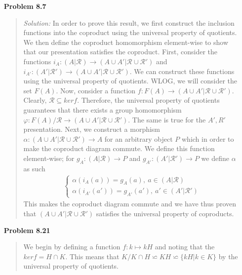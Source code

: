 \documentclass{article}
\newcommand{\Solution}{\textit{Solution: }}
\begin{document}
\begin{enumerate}
        \item[\textbf{Problem 8.7}]
        \begin{quote}
            \Solution In order to prove this result, we first construct the inclusion functions into the 
            coproduct using the universal property of quotients. We then define the coproduct homomorphism
            element-wise to show that our presentation satisfies the coproduct. First, consider the functions
            $i_A: (A \vert \mathcal{R}) \to (A \cup A' \vert \mathcal{R} \cup \mathcal{R'})$ and 
            $i_{A'}: (A' \vert \mathcal{R'}) \to (A \cup A' \vert \mathcal{R} \cup \mathcal{R'})$. We can construct these 
            functions using the universal property of quotients. WLOG, we will consider the set $F(A)$. Now, consider a 
            function $f: F(A) \to (A \cup A' \vert \mathcal{R} \cup \mathcal{R'})$. Clearly, $\mathcal{R} \subseteq ker f$.
            Therefore, the universal property of quotients guarantees that there exists a group homomorphism 
            $\varphi: F(A) / \mathcal{R} \to (A \cup A' \vert \mathcal{R} \cup \mathcal{R'})$. The same is true for the 
            $A', R'$ presentation. Next, we construct a morphism $\alpha: (A \cup A' \vert \mathcal{R} \cup \mathcal{R'}) 
            \to A$ for an arbitrary object $P$ which in order to make the coproduct diagram commute. We define this function
            element-wise; for $g_A: (A \vert \mathcal{R}) \to P$ and $g_{A'}: (A' \vert \mathcal{R'}) \to P$ we define $\alpha$
            as such
            \begin{gather*}
                \begin{cases}
                    \alpha(i_A(a)) = g_A(a), \: a \in (A \vert \mathcal{R}) \\
                    \alpha(i_{A'}(a')) = g_{A'}(a'), \: a' \in (A' \vert \mathcal{R'})
                \end{cases}
            \end{gather*}
            This makes the coproduct diagram commute and we have thus proven that $(A \cup A' \vert \mathcal{R} \cup \mathcal{R'})$
            satisfies the universal property of coproducts. \qedsymbol
        \end{quote} 
        \item[\textbf{Problem 8.21}]
            \begin{quote}
                We begin by defining a function $f: k \mapsto kH$ and noting that the $ker f = H \cap K$. This means that 
                $K/K \cap H \backsimeq KH \backsimeq \{kH \vert k \in K\}$ by the universal property of quotients. 

\end{quote}
\end{enumerate}
\end{document}
